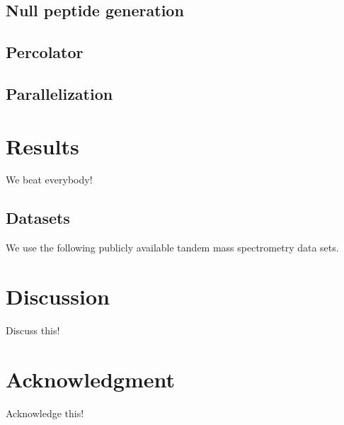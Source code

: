 \documentclass{bioinfo}
\begin{document}
\subsection*{Null peptide generation}
\subsection*{Percolator}
\subsection*{Parallelization}

\section{Results}

We beat everybody!

\subsection*{Datasets}
We use the following publicly available tandem mass spectrometry data sets.

\section{Discussion}
Discuss this!

\section*{Acknowledgment}

Acknowledge this!





 
\end{document}
